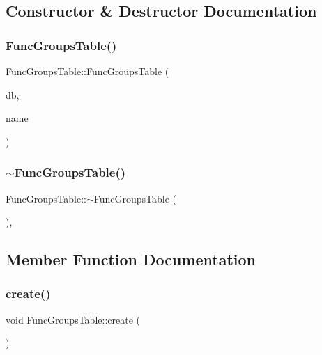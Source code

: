 \subsection{Constructor \& Destructor Documentation}
\mbox{\label{class_func_groups_table_af62fb106ad32807f2430fc7f02cd419a}} 
\subsubsection{\texorpdfstring{FuncGroupsTable()}{FuncGroupsTable()}}
{\footnotesize\ttfamily Func\+Groups\+Table\+::\+Func\+Groups\+Table (\begin{DoxyParamCaption}\item[{std\+::shared\+\_\+ptr$<$ sqlite\+::\+S\+Q\+Lite\+Storage $>$}]{db,  }\item[{std\+::string}]{name }\end{DoxyParamCaption})}

\mbox{\label{class_func_groups_table_a0625c13b27a86c3b38ee6f3589911283}} 
\subsubsection{\texorpdfstring{$\sim$FuncGroupsTable()}{~FuncGroupsTable()}}
{\footnotesize\ttfamily Func\+Groups\+Table\+::$\sim$\+Func\+Groups\+Table (\begin{DoxyParamCaption}{ }\end{DoxyParamCaption})\hspace{0.3cm}{\ttfamily [default]}, {\ttfamily [noexcept]}}



\subsection{Member Function Documentation}
\mbox{\label{class_func_groups_table_a21eff426b6bb8955bef5d4eace60364e}} 
\subsubsection{\texorpdfstring{create()}{create()}}
{\footnotesize\ttfamily void Func\+Groups\+Table\+::create (\begin{DoxyParamCaption}{ }\end{DoxyParamCaption})}

